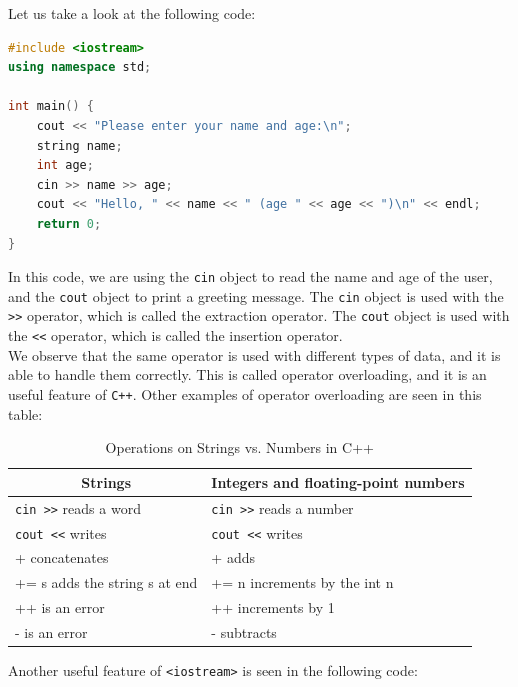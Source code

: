 Let us take a look at the following code:

\begin{lstlisting}[language=C++]
#include <iostream>
using namespace std;

int main() {
    cout << "Please enter your name and age:\n";
    string name;
    int age;
    cin >> name >> age;
    cout << "Hello, " << name << " (age " << age << ")\n" << endl;
    return 0;
}
\end{lstlisting}

In this code, we are using the \texttt{cin} object to read the name and age of the user, and the
\texttt{cout} object to print a greeting message. The \texttt{cin} object is used with the \texttt{>>}
operator, which is called the extraction operator. The \texttt{cout} object is used with the \texttt{<<}
operator, which is called the insertion operator.\\

We observe that the same operator is used with different types of data, and it is able to handle 
them correctly. This is called operator overloading, and it is an useful feature of \texttt{C++}. Other 
examples of operator overloading are seen in this table:\\

\begin{table}[ht]
    \centering
    \begin{tabular}{|l|l|}
    \hline
    \multicolumn{1}{|c|}{\textbf{Strings}} & \multicolumn{1}{c|}{\textbf{Integers and floating-point numbers}} \\
    \hline
    \texttt{cin >>} reads a word & \texttt{cin >>} reads a number \\
    \hline
    \texttt{cout <<} writes & \texttt{cout <<} writes \\
    \hline
    + concatenates & + adds \\
    \hline
    += s adds the string s at end & += n increments by the int n \\
    \hline
    ++ is an error & ++ increments by 1 \\
    \hline
    - is an error & - subtracts \\
    \hline
    \end{tabular}
    \caption{Operations on Strings vs. Numbers in C++}
    \label{tab:cpp_operations}
\end{table}

Another useful feature of \texttt{<iostream>} is seen in the following code:\\

